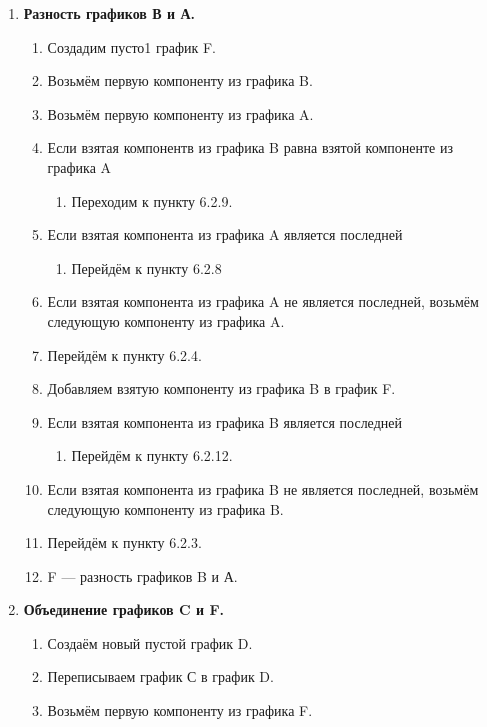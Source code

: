 \documentclass[a4paper,12pt]{extarticle}
\begin{document}
\begin{enumerate}
\begin{enumerate}[label*=\arabic*.]
\begin{enumerate}[label*=\arabic*.]
    \end{enumerate}
    \item \textbf{Разность графиков В и А.}
    \begin{enumerate}[label*=\arabic*.]
      \item Создадим пусто1 график F.
      \item Возьмём первую компоненту из графика B.
      \item Возьмём первую компоненту из графика A.
      \item Если взятая компонентв из графика B равна взятой компоненте из графика A
      \begin{enumerate}[label*=\arabic*.]
        \item Переходим к пункту 6.2.9.
      \end{enumerate}
      \item Если взятая компонента из графика A является последней
      \begin{enumerate}
        \item Перейдём к пункту 6.2.8
      \end{enumerate}
      \item Если взятая компонента из графика A не является последней, возьмём следующую компоненту из графика A.
      \item Перейдём к пункту 6.2.4.
      \item Добавляем взятую компоненту из графика B в график F.
      \item Если взятая компонента из графика B является последней
      \begin{enumerate}[label*=\arabic*.]
        \item Перейдём к пункту 6.2.12.
      \end{enumerate}
      \item Если взятая компонента из графика B не является последней, возьмём следующую компоненту из графика B.
      \item Перейдём к пункту 6.2.3.
      \item F — разность графиков B и А.
    \end{enumerate}
    \item\textbf{Объединение графиков C и F.}
    \begin{enumerate}[label*=\arabic*.]
      \item Создаём новый пустой график D.
      \item Переписываем график С в график D.
      \item Возьмём первую компоненту из графика F.

\end{enumerate}
\end{enumerate}
\end{enumerate}
\end{document}
